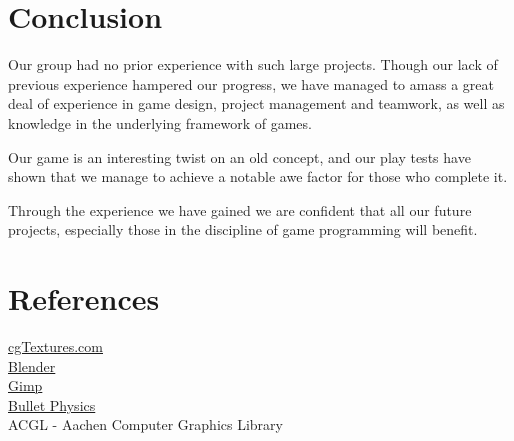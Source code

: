 \documentclass[sponsored]{acmsiggraph}
\begin{document}
\section{Conclusion}

Our group had no prior experience with such large projects. Though our lack of previous experience hampered our progress, we have managed to amass a great deal of experience in game design, project management and teamwork, as well as knowledge in the underlying framework of games.

Our game is an interesting twist on an old concept, and our play tests have shown that we manage to achieve a notable awe factor for those who complete it.

Through the experience we have gained we are confident that all our future projects, especially those in the discipline of game programming will benefit.

\section{References}

\href{http://cgTextures.com}{cgTextures.com}\\
\href{http://blender.org}{Blender}\\
\href{http://Gimp.org}{Gimp}\\
\href{http://bulletphysics.org}{Bullet Physics}\\
ACGL - Aachen Computer Graphics Library


%



\end{document}
